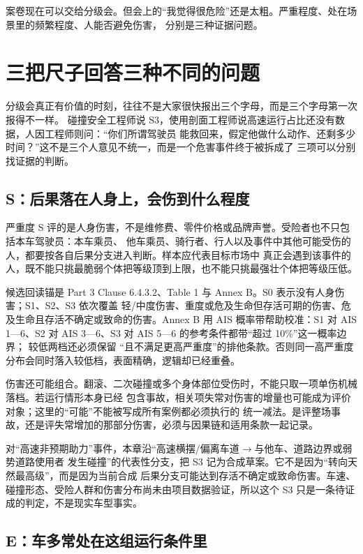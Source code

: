 案卷现在可以交给分级会。但会上的“我觉得很危险”还是太粗。严重程度、处在场景里的频繁程度、人能否避免伤害，
分别是三种证据问题。

\section{三把尺子回答三种不同的问题}

分级会真正有价值的时刻，往往不是大家很快报出三个字母，而是三个字母第一次报得不一样。
碰撞安全工程师说 S3，使用剖面工程师说高速运行占比还没有数据，人因工程师则问：“你们所谓驾驶员
能救回来，假定他做什么动作、还剩多少时间？”这不是三个人意见不统一，而是一个危害事件终于被拆成了
三项可以分别找证据的判断。

\subsection{S：后果落在人身上，会伤到什么程度}

严重度 S 评的是人身伤害，不是维修费、零件价格或品牌声誉。受险者也不只包括本车驾驶员：本车乘员、
他车乘员、骑行者、行人以及事件中其他可能受伤的人，都要按各自后果分支进入判断。样本应代表目标市场中
真正会遇到该事件的人，既不能只挑最脆弱个体把等级顶到上限，也不能只挑最强壮个体把等级压低。

候选回读锚是 Part 3 Clause 6.4.3.2、Table 1 与 Annex B。S0 表示没有人身伤害；S1、S2、S3 依次覆盖
轻/中度伤害、重度或危及生命但存活可期的伤害、危及生命且存活不确定或致命的伤害。Annex B 用 AIS
概率带帮助校准：S1 对 AIS 1—6、S2 对 AIS 3—6、S3 对 AIS 5—6 的参考条件都带“超过 10\%”这一概率边界；
较低两档还必须保留
“且不满足更高严重度”的排他条款。否则同一高严重度分布会同时落入较低档，表面精确，逻辑却已经重叠。

伤害还可能组合。翻滚、二次碰撞或多个身体部位受伤时，不能只取一项单伤机械落档。若运行情形本身已经
包含事故，相关项失常对伤害的增量也可能成为评价对象；这里的“可能”不能被写成所有案例都必须执行的
统一减法。是评整场事故，还是评失常增加的那部分伤害，必须与因果链和适用条款一起记录。

对“高速非预期助力”事件，本章沿“高速横摆/偏离车道\(\rightarrow\)与他车、道路边界或弱势道路使用者
发生碰撞”的代表性分支，把 S3 记为合成草案。它不是因为“转向天然最高级”，而是因为当前合成
后果分支可能达到存活不确定或致命伤害。车速、碰撞形态、受险人群和伤害分布尚未由项目数据验证，所以这个
S3 只是一条待证成的判定，不是现实车型事实。

\subsection{E：车多常处在这组运行条件里}

